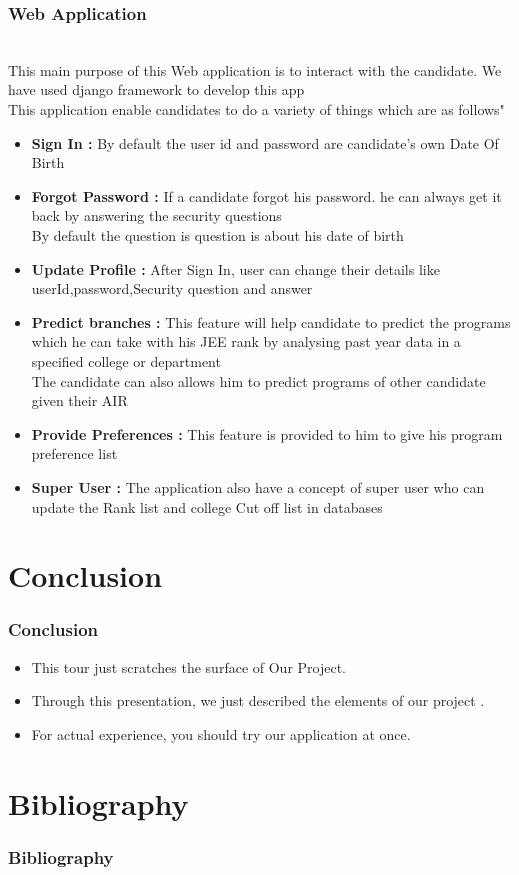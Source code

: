 \documentclass{beamer}
\begin{document}
\begin{frame}
\frametitle{Web Application}
\pause
\\
This main purpose of this Web application is to interact with the candidate. We have used django\cite{django} framework to develop this app
\pause
\\This application enable candidates to do a variety of things which are as follows"
\pause
\\

\begin{itemize}
\item {\bf Sign In : } By default the user id and password are candidate's own Date Of Birth  
\pause
\item {\bf Forgot Password : } If a candidate forgot his password. he can always get it back by answering the security questions
\pause
\\By default the question is question is about his date of birth 
\pause
\item {\bf Update Profile :} After Sign In, user can change their details like userId,password,Security question and answer
\pause
\item { \bf Predict branches : } This feature will help candidate to predict the programs which he can take with his JEE rank by analysing past year data in a specified college or department
\pause
\\The candidate can also allows him to predict programs of other candidate given their AIR
\pause
\item { \bf Provide Preferences : } This feature is provided to him to give his program preference list 
\item { \bf Super User : } The application also have a concept of super user who can update the Rank list and college Cut off list in databases


\end{itemize}

\end{frame}

\section{Conclusion}

\begin{frame}
\frametitle{Conclusion}

\begin{itemize}

\item This tour just scratches the surface of Our Project.  
\pause

\item Through this presentation, we just described the elements of our project .
\pause

\item For actual experience, you should try our application at once.

\end{itemize}

\end{frame}

\section{Bibliography}
\begin{frame}


\frametitle{Bibliography}
\nocite{*}



\end{frame}
\end{document}
